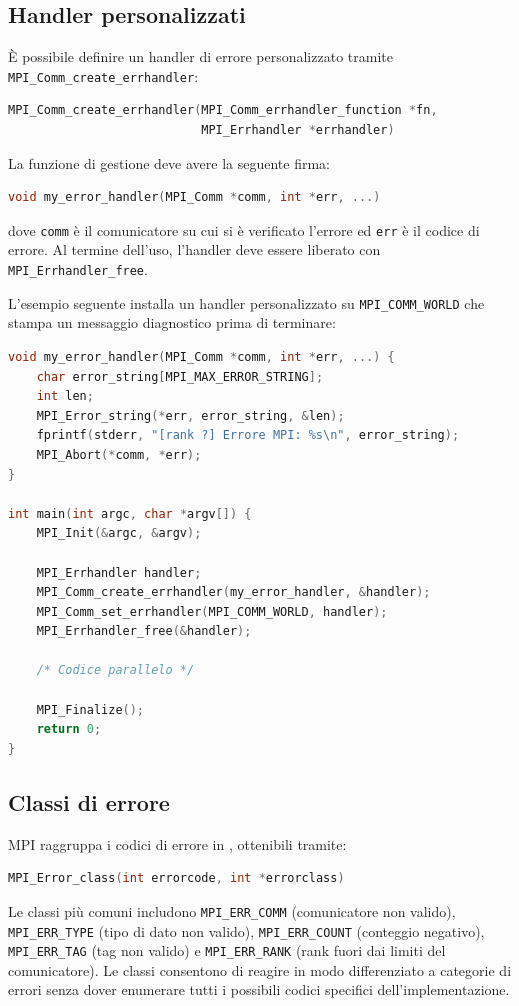 \subsection{Handler personalizzati}
È possibile definire un handler di errore personalizzato tramite \texttt{MPI\_Comm\_create\_errhandler}:
\begin{lstlisting}[language=C, numbers=none]
MPI_Comm_create_errhandler(MPI_Comm_errhandler_function *fn,
                           MPI_Errhandler *errhandler)
\end{lstlisting}
La funzione di gestione deve avere la seguente firma:
\begin{lstlisting}[language=C, numbers=none]
void my_error_handler(MPI_Comm *comm, int *err, ...)
\end{lstlisting}
dove \texttt{comm} è il comunicatore su cui si è verificato l'errore ed \texttt{err} è il codice di errore. Al termine dell'uso, l'handler deve essere liberato con \texttt{MPI\_Errhandler\_free}.

L'esempio seguente installa un handler personalizzato su \texttt{MPI\_COMM\_WORLD} che stampa un messaggio diagnostico prima di terminare:
\begin{lstlisting}[language=C, numbers=none]
void my_error_handler(MPI_Comm *comm, int *err, ...) {
    char error_string[MPI_MAX_ERROR_STRING];
    int len;
    MPI_Error_string(*err, error_string, &len);
    fprintf(stderr, "[rank ?] Errore MPI: %s\n", error_string);
    MPI_Abort(*comm, *err);
}

int main(int argc, char *argv[]) {
    MPI_Init(&argc, &argv);

    MPI_Errhandler handler;
    MPI_Comm_create_errhandler(my_error_handler, &handler);
    MPI_Comm_set_errhandler(MPI_COMM_WORLD, handler);
    MPI_Errhandler_free(&handler);

    /* Codice parallelo */

    MPI_Finalize();
    return 0;
}
\end{lstlisting}

\subsection{Classi di errore}
MPI raggruppa i codici di errore in , ottenibili tramite:
\begin{lstlisting}[language=C, numbers=none]
MPI_Error_class(int errorcode, int *errorclass)
\end{lstlisting}
Le classi più comuni includono \texttt{MPI\_ERR\_COMM} (comunicatore non valido), \texttt{MPI\_ERR\_TYPE} (tipo di dato non valido), \texttt{MPI\_ERR\_COUNT} (conteggio negativo), \texttt{MPI\_ERR\_TAG} (tag non valido) e \texttt{MPI\_ERR\_RANK} (rank fuori dai limiti del comunicatore). Le classi consentono di reagire in modo differenziato a categorie di errori senza dover enumerare tutti i possibili codici specifici dell'implementazione.

